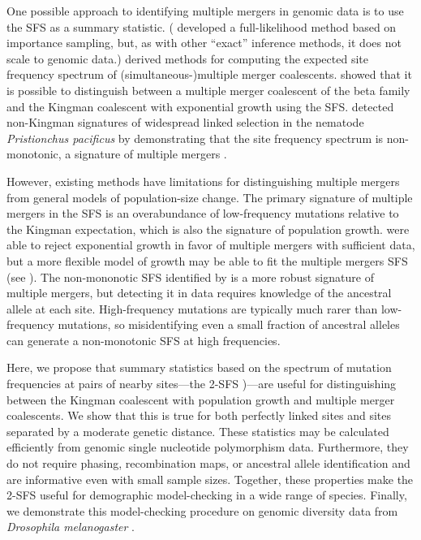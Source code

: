 \documentclass[11pt, letterpaper]{article}   	%
\begin{document}
One possible approach to identifying multiple mergers in genomic data is to use the SFS as a summary statistic.
(\cite{Koskela2015} developed a full-likelihood method based on importance sampling, but, as with other ``exact'' inference methods, it does not scale to genomic data.)
\cite{BirknerEtAl2013, BlathEtAl2016, SpenceEtAl2016} derived methods for computing the expected site frequency spectrum of (simultaneous-)multiple merger coalescents.
\cite{EldonEtAl2015} showed that it is possible to distinguish between a multiple merger coalescent of the beta family and the Kingman coalescent with exponential growth using the SFS.
\cite{RodelspergerEtAl2014} detected non-Kingman signatures of widespread linked selection in the nematode \textit{Pristionchus pacificus} by demonstrating that the site frequency spectrum is non-monotonic, a signature of multiple mergers \autocite{NeherHallatscheck2013, BirknerEtAl2013}.

However, existing methods have limitations for distinguishing multiple mergers from general models of population-size change.
The primary signature of multiple mergers in the SFS is an overabundance of low-frequency mutations relative to the Kingman expectation, which is also the signature of population growth.
\cite{EldonEtAl2015} were able to reject exponential growth in favor of multiple mergers with sufficient data, but a more flexible model of growth may be able to fit the multiple mergers SFS (see \cite{MyersEtAl2008, BhaskarSong2014}).
The non-mononotic SFS identified by \cite{RodelspergerEtAl2014} is a more robust signature of multiple mergers, but detecting it in data requires knowledge of the ancestral allele at each site.
High-frequency mutations are typically much rarer than low-frequency mutations, so misidentifying even a small fraction of ancestral alleles can generate a non-monotonic SFS at high frequencies.

Here, we propose that summary statistics based on the spectrum of mutation frequencies at pairs of nearby sites---the 2-SFS \autocite{Hudson2001, FerrettiEtal2018})---are useful for distinguishing between the Kingman coalescent with population growth and multiple merger coalescents.
We show that this is true for both perfectly linked sites and sites separated by a moderate genetic distance.
These statistics may be calculated efficiently from genomic single nucleotide polymorphism data.
Furthermore, they do not require phasing, recombination maps, or ancestral allele identification and are informative even with small sample sizes.
Together, these properties make the 2-SFS useful for demographic model-checking in a wide range of species.
Finally, we demonstrate this model-checking procedure on genomic diversity data from \textit{Drosophila melanogaster} \autocite{LackEtAl2015}.
\end{document}
